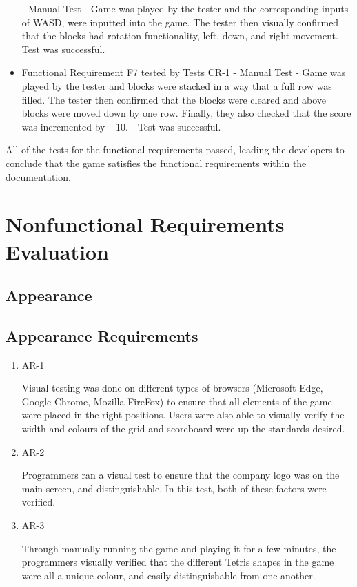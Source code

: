 \documentclass[12pt, titlepage]{article}
\begin{document}
\begin{itemize}
    \subitem - Manual Test
    \subitem - Game was played by the tester and the corresponding inputs of WASD, were inputted into the game. The tester then visually confirmed that the blocks had rotation functionality, left, down, and right movement.
    \subitem - Test was successful.
    \item Functional Requirement F7 tested by Tests CR-1
    \subitem - Manual Test
    \subitem - Game was played by the tester and blocks were stacked in a way that a full row was filled. The tester then confirmed that the blocks were cleared and above blocks were moved down by one row. Finally, they also checked that the score was incremented by +10.
    \subitem - Test was successful.
\end{itemize}

All of the tests for the functional requirements passed, leading the developers to conclude that the game satisfies the functional requirements within the documentation. 

\section{Nonfunctional Requirements Evaluation}

\subsection{Appearance}

\subsection{Appearance Requirements}

\begin{enumerate}

\item{AR-1\\}

Visual testing was done on different types of browsers (Microsoft Edge, Google Chrome, Mozilla FireFox) to ensure that all elements of the game were placed in the right positions. Users were also able to visually verify the width and colours of the grid and scoreboard were up the standards desired.
					
\item{AR-2\\}

Programmers ran a visual test to ensure that the company logo was on the main screen, and distinguishable. In this test, both of these factors were verified.


\item{AR-3\\}

Through manually running the game and playing it for a few minutes, the programmers visually verified that the different Tetris shapes in the game were all a unique colour, and easily distinguishable from one another.

\end{enumerate}
\end{document}
